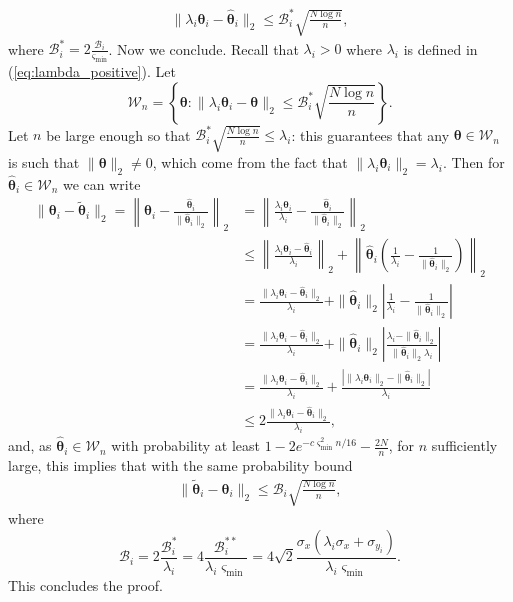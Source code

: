 \documentclass{article} %
\def\eqref#1{equation~\ref{#1}}
\renewcommand{\eqref}[1]{(\ref{#1})}
\begin{document}
$$
\begin{aligned}
\|\lambda_i\boldsymbol{\theta}_i-\widehat{\boldsymbol{\theta}}_{i}\|_{2} \leq \mathscr{B}_i^* \sqrt{\frac{N\log n}{n}},
\end{aligned}
$$
\noindent
where $\mathscr{B}_i^* = 2\frac{\mathscr{B}_i}{\varsigma_{\min}}$. Now we conclude. Recall that $\lambda_i>0$ where $\lambda_i$ is defined in \eqref{eq:lambda_positive}. Let 
$$
\mathcal{W}_n= \left\{\boldsymbol{\theta}:\|\lambda_i\boldsymbol{\theta}_i-\boldsymbol{\theta}\|_{2}\leq \mathscr{B}_i^* \sqrt{\frac{N\log n}{n}}\right\}.
$$
Let $n$ be large enough so that $\mathscr{B}_i^* \sqrt{\frac{N\log n}{n}} \leq \lambda_i$: this guarantees that any $\boldsymbol{\theta} \in \mathcal{W}_n$ is such that $\|\boldsymbol{\theta}\|_2 \neq 0$, which come from the fact that $\|\lambda_i\boldsymbol{\theta}_i\|_2=\lambda_i$. Then for $\widehat{\boldsymbol{\theta}}_{i}\in \mathcal{W}_n$ we can write
$$
\begin{aligned}
\|\boldsymbol{\theta}_i - \widetilde{\boldsymbol{\theta}}_{i} \|_2=\left\|\boldsymbol{\theta}_i - \frac{\widehat{\boldsymbol{\theta}}_{i} }{\|\widehat{\boldsymbol{\theta}}_{i} \|_2} \right\|_2& = \left\|\frac{ \lambda_i \boldsymbol{\theta}_i }{ \lambda_i }- \frac{\widehat{\boldsymbol{\theta}}_{i} }{\|\widehat{\boldsymbol{\theta}}_{i} \|_2}\right\|_2 \\
& \leq \left\|\frac{\lambda_i \boldsymbol{\theta}_i - \widehat{\boldsymbol{\theta}}_{i}}{\lambda_i}\right\|_2 + \left\| \widehat{\boldsymbol{\theta}}_{i}  \left(\frac{1}{\lambda_i}- \frac{1}{ \|\widehat{\boldsymbol{\theta}}_{i} \|_2 }\right)\right\|_2\\
& = \frac{\|\lambda_i \boldsymbol{\theta}_i - \widehat{\boldsymbol{\theta}}_{i} \|_2}{\lambda_i} + \|\widehat{\boldsymbol{\theta}}_{i} \|_2 \left|\frac{1}{\lambda_i}- \frac{1}{ \|\widehat{\boldsymbol{\theta}}_{i} \|_2 }\right|\\
& = \frac{\|\lambda_i \boldsymbol{\theta}_i - \widehat{\boldsymbol{\theta}}_{i} \|_2}{\lambda_i} + \|\widehat{\boldsymbol{\theta}}_{i} \|_2 \left|\frac{ \lambda_i-\|\widehat{\boldsymbol{\theta}}_{i} \|_2}{\|\widehat{\boldsymbol{\theta}}_{i} \|_2  \lambda_i }\right|\\
& = \frac{\|\lambda_i \boldsymbol{\theta}_i - \widehat{\boldsymbol{\theta}}_{i} \|_2}{\lambda_i} + \frac{|\|\lambda_i\boldsymbol{\theta}_i\|_2-\|\widehat{\boldsymbol{\theta}}_{i} \|_2|}{  \lambda_i }\\
& \leq 2 \frac{\|\lambda_i \boldsymbol{\theta}_i - \widehat{\boldsymbol{\theta}}_{i} \|_2}{\lambda_i} ,
\end{aligned}
$$
and, as $\widehat{\boldsymbol{\theta}}_i\in \mathcal{W}_n$ with probability at least $1- 2e^{-c \varsigma_{\min}^{2} n / 16}-\tfrac{2N}{n}$, for $n$ sufficiently large, this implies that with the same probability bound
$$
\begin{aligned}
\|\widetilde{\boldsymbol{\theta}}_{i}- \boldsymbol{\theta}_i \|_2 \leq \mathscr{B}_i \sqrt{\frac{N\log n}{n}},
\end{aligned}
$$
where 
$$
\mathscr{B}_i = 2\frac{\mathscr{B}_i^*}{\lambda_i}=4\frac{\mathscr{B}_i^{**}}{\lambda_i \varsigma_{\min}}=4\sqrt{2}\frac{\sigma_x (\lambda_i\sigma_x+\sigma_{y_i})}{\lambda_i \varsigma_{\min}}.
$$
This concludes the proof.
\end{document}

